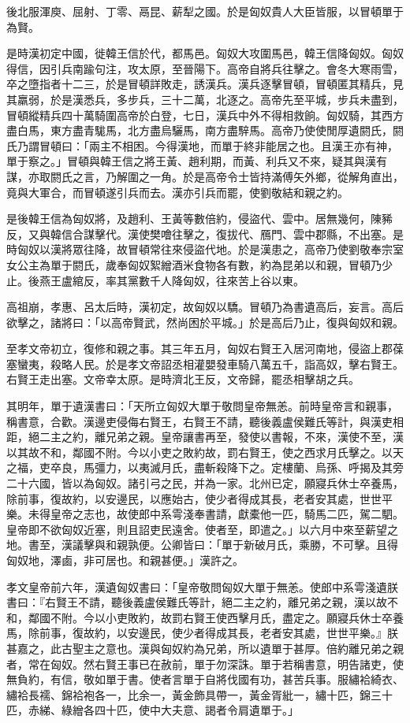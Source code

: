 \begin{pinyinscope}
後北服渾庾、屈射、丁零、鬲昆、薪犁之國。於是匈奴貴人大臣皆服，以冒頓單于為賢。

是時漢初定中國，徙韓王信於代，都馬邑。匈奴大攻圍馬邑，韓王信降匈奴。匈奴得信，因引兵南踰句注，攻太原，至晉陽下。高帝自將兵往擊之。會冬大寒雨雪，卒之墮指者十二三，於是冒頓詳敗走，誘漢兵。漢兵逐擊冒頓，冒頓匿其精兵，見其羸弱，於是漢悉兵，多步兵，三十二萬，北逐之。高帝先至平城，步兵未盡到，冒頓縱精兵四十萬騎圍高帝於白登，七日，漢兵中外不得相救餉。匈奴騎，其西方盡白馬，東方盡青駹馬，北方盡烏驪馬，南方盡騂馬。高帝乃使使閒厚遺閼氏，閼氏乃謂冒頓曰：「兩主不相困。今得漢地，而單于終非能居之也。且漢王亦有神，單于察之。」冒頓與韓王信之將王黃、趙利期，而黃、利兵又不來，疑其與漢有謀，亦取閼氏之言，乃解圍之一角。於是高帝令士皆持滿傅矢外鄉，從解角直出，竟與大軍合，而冒頓遂引兵而去。漢亦引兵而罷，使劉敬結和親之約。

是後韓王信為匈奴將，及趙利、王黃等數倍約，侵盜代、雲中。居無幾何，陳豨反，又與韓信合謀擊代。漢使樊噲往擊之，復拔代、鴈門、雲中郡縣，不出塞。是時匈奴以漢將眾往降，故冒頓常往來侵盜代地。於是漢患之，高帝乃使劉敬奉宗室女公主為單于閼氏，歲奉匈奴絮繒酒米食物各有數，約為昆弟以和親，冒頓乃少止。後燕王盧綰反，率其黨數千人降匈奴，往來苦上谷以東。

高祖崩，孝惠、呂太后時，漢初定，故匈奴以驕。冒頓乃為書遺高后，妄言。高后欲擊之，諸將曰：「以高帝賢武，然尚困於平城。」於是高后乃止，復與匈奴和親。

至孝文帝初立，復修和親之事。其三年五月，匈奴右賢王入居河南地，侵盜上郡葆塞蠻夷，殺略人民。於是孝文帝詔丞相灌嬰發車騎八萬五千，詣高奴，擊右賢王。右賢王走出塞。文帝幸太原。是時濟北王反，文帝歸，罷丞相擊胡之兵。

其明年，單于遺漢書曰：「天所立匈奴大單于敬問皇帝無恙。前時皇帝言和親事，稱書意，合歡。漢邊吏侵侮右賢王，右賢王不請，聽後義盧侯難氏等計，與漢吏相距，絕二主之約，離兄弟之親。皇帝讓書再至，發使以書報，不來，漢使不至，漢以其故不和，鄰國不附。今以小吏之敗約故，罰右賢王，使之西求月氏擊之。以天之福，吏卒良，馬彊力，以夷滅月氏，盡斬殺降下之。定樓蘭、烏孫、呼揭及其旁二十六國，皆以為匈奴。諸引弓之民，并為一家。北州已定，願寢兵休士卒養馬，除前事，復故約，以安邊民，以應始古，使少者得成其長，老者安其處，世世平樂。未得皇帝之志也，故使郎中系雩淺奉書請，獻橐他一匹，騎馬二匹，駕二駟。皇帝即不欲匈奴近塞，則且詔吏民遠舍。使者至，即遣之。」以六月中來至薪望之地。書至，漢議擊與和親孰便。公卿皆曰：「單于新破月氏，乘勝，不可擊。且得匈奴地，澤鹵，非可居也。和親甚便。」漢許之。

孝文皇帝前六年，漢遺匈奴書曰：「皇帝敬問匈奴大單于無恙。使郎中系雩淺遺朕書曰：『右賢王不請，聽後義盧侯難氏等計，絕二主之約，離兄弟之親，漢以故不和，鄰國不附。今以小吏敗約，故罰右賢王使西擊月氏，盡定之。願寢兵休士卒養馬，除前事，復故約，以安邊民，使少者得成其長，老者安其處，世世平樂。』朕甚嘉之，此古聖主之意也。漢與匈奴約為兄弟，所以遺單于甚厚。倍約離兄弟之親者，常在匈奴。然右賢王事已在赦前，單于勿深誅。單于若稱書意，明告諸吏，使無負約，有信，敬如單于書。使者言單于自將伐國有功，甚苦兵事。服繡袷綺衣、繡袷長襦、錦袷袍各一，比余一，黃金飾具帶一，黃金胥紕一，繡十匹，錦三十匹，赤綈、綠繒各四十匹，使中大夫意、謁者令肩遺單于。」


\end{pinyinscope}
